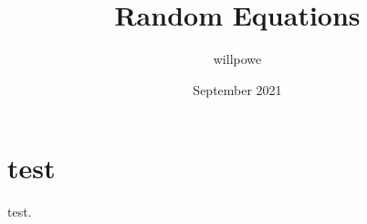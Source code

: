 \documentclass{article}
\title{Random Equations}
\author{willpowe}
\date{September 2021}
\begin{document}
\section{test}
test.
\end{document}
